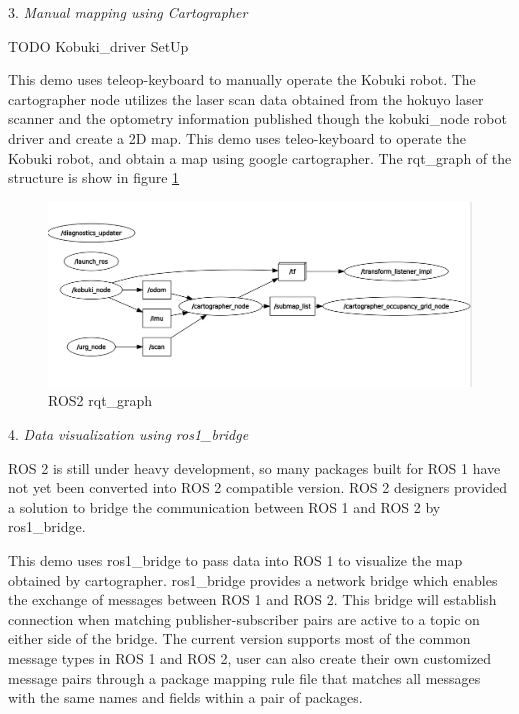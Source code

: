 \documentclass[letterpaper, 10 pt, conference]{ieeeconf}  %
\begin{document}
3. \textit{Manual mapping using Cartographer}\par\vspace{5pt} TODO Kobuki\_driver SetUp \par\vspace{5pt}
This demo uses teleop-keyboard to manually operate the Kobuki robot. The cartographer node utilizes the laser scan data obtained from the hokuyo laser scanner and the optometry information published though the kobuki\_node robot driver and create a 2D map. 
This demo uses teleo-keyboard to operate the Kobuki robot, and obtain a map using google cartographer. The rqt\_graph of the structure is show in figure \ref{fig:rqt}\par\vspace{5pt}
\begin{figure}[ht]
  \includegraphics[width=\linewidth]{qrt_graph.png}
  \caption{ROS2 rqt\_graph} 
  \label{fig:rqt}
\end{figure}
4. \textit{Data visualization using ros1\_bridge}\par\vspace{5pt} 
ROS 2 is still under heavy development, so many packages built for ROS 1 have not yet been converted into ROS 2 compatible version. ROS 2 designers provided a solution to bridge the communication between ROS 1 and ROS 2 by ros1\_bridge.  

This demo uses ros1\_bridge to pass data into ROS 1 to visualize the map obtained by cartographer. ros1\_bridge provides a network bridge which enables the exchange of messages between ROS 1 and ROS 2. This bridge will establish connection when matching publisher-subscriber pairs are active to a topic on either side of the bridge\cite{c4}. The current version supports most of the common message types in ROS 1 and ROS 2, user can also create their own customized message pairs through a package mapping rule file that matches all messages with the same names and fields within a pair of packages.\par\vspace{5pt} 
\end{document}
